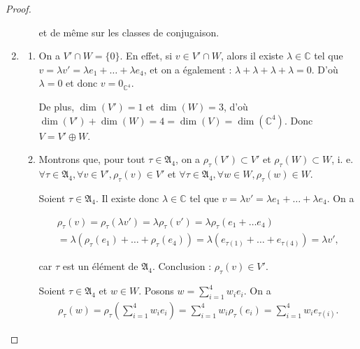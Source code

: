 \documentclass[french]{book}
\theoremstyle{definition}
\begin{document}
\begin{proof}
\begin{enumerate}
\begin{enumerate}
      et de même sur les classes de conjugaison.
    \end{enumerate}
    \item \begin{enumerate}
      \item On a \(V' \cap W = \{ 0 \}\). En effet, si \(v \in V' \cap W\), alors il existe \(\lambda \in \mathbb{C}\) tel que \(v = \lambda v' = \lambda e_1 + \dots + \lambda e_4\), et on a également : \(\lambda + \lambda + \lambda + \lambda = 0\). D'où \(\lambda = 0\) et donc \(v = 0 _{\mathbb{C}^{4}}\).

      De plus, \(\operatorname{dim}(V') = 1\) et \(\operatorname{dim}(W)=3\), d'où \(\operatorname{dim}(V')+ \operatorname{dim}(W) = 4 = \operatorname{dim}(V) =\operatorname{dim}(\mathbb{C} ^{4})\). Donc \(V = V' \oplus W\).
      \item Montrons que, pour tout \(\tau \in \mathfrak{A}_{4}\), on a \(\rho _{\tau}(V')\subset V'\) et \(\rho _{\tau}(W) \subset W\), i. e. \(\forall \tau \in \mathfrak{A}_{4}, \forall v \in V', \rho _{\tau}(v) \in V'\) et \(\forall \tau \in \mathfrak{A}_{4}, \forall w \in W, \rho _{\tau}(w) \in W\).

      Soient \(\tau \in \mathfrak{A}_{4}\). Il existe donc \(\lambda \in \mathbb{C}\) tel que \(v =  \lambda v' = \lambda e_1 + \dots + \lambda e_4\). On a

      \begin{gather*}
        \rho _{\tau}(v) = \rho _{\tau}(\lambda v') = \lambda \rho _{\tau}(v') = \lambda \rho _{\tau}(e_1 + \dots e_4) \\
        = \lambda(\rho _{\tau}(e_1) + \dots + \rho _{\tau}(e_4)) = \lambda (e _{\tau(1)} + \dots + e _{\tau(4)}) = \lambda v',
      \end{gather*}

      car \(\tau\) est un élément de \(\mathfrak{A}_{4}\). Conclusion : \(\rho _{\tau}(v) \in V'\).

      Soient \(\tau \in \mathfrak{A}_{4}\) et \(w \in W\). Posons \(w = \displaystyle\sum_{i=1}^{4} w_i e_i \). On a
      \begin{gather*}
        \rho _{\tau}(w) = \rho _{\tau}\left(\sum_{i=1}^{4} w_i e_i \right) = \sum_{i=1}^{4} w_i \rho _{\tau}(e_i) = \sum_{i=1}^{4} w_i e _{\tau(i)}.
      \end{gather*}


\end{enumerate}
\end{enumerate}
\end{proof}
\end{document}
